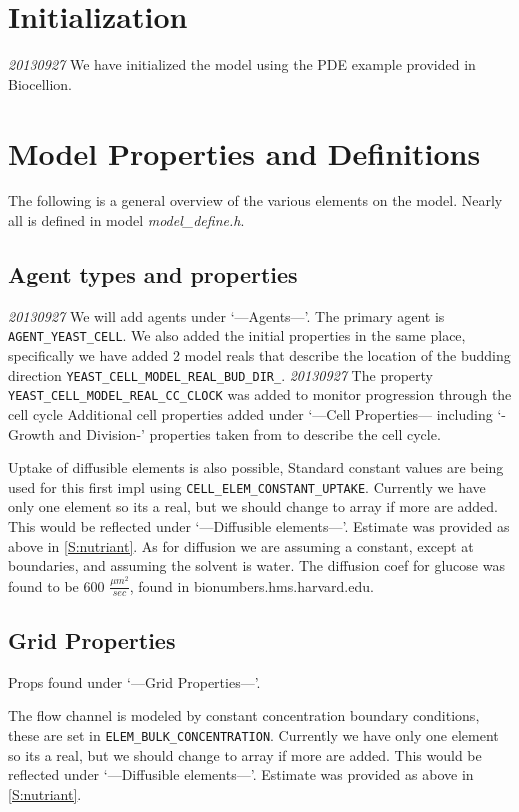\documentclass{article}
\begin{document}
\section{Initialization}
\emph{20130927} We have initialized the model using the PDE example provided in Biocellion.

\section{Model Properties and Definitions}
The following is a general overview of the various elements on the model.
Nearly all is defined in model \textit{model\_define.h}.

\subsection{Agent types and properties}
\emph{20130927} We will add agents under `---Agents---'.
The primary agent is \texttt{AGENT\_YEAST\_CELL}.
We also added the initial properties in the same place,
specifically we have added 2 model reals that describe the 
location of the budding direction \texttt{YEAST\_CELL\_MODEL\_REAL\_BUD\_DIR\_}.
\emph{20130927} The property \texttt{YEAST\_CELL\_MODEL\_REAL\_CC\_CLOCK}
was added to monitor progression through the cell cycle \cite{Charvin2009}
Additional cell properties added under `---Cell Properties--- including 
`-Growth and Division-' properties taken from \cite{Charvin2009} to describe the cell cycle.

Uptake of diffusible elements is also possible,
Standard constant values are being used for this first impl using \texttt{CELL\_ELEM\_CONSTANT\_UPTAKE}.
Currently we have only one element so its a real, 
but we should change to array if more are added.
This would be reflected under `---Diffusible elements---'.
Estimate was provided as above in \ref{S:nutriant}.
As for diffusion we are assuming a constant, except at boundaries,
and assuming the solvent is water.
The diffusion coef for glucose was found to be 600 $\frac{\mu m^2}{sec}$,
found in bionumbers.hms.harvard.edu.



\subsection{Grid Properties} 
Props found under `---Grid Properties---'.

The flow channel is modeled by constant concentration boundary conditions, 
these are set in \texttt{ELEM\_BULK\_CONCENTRATION}.
Currently we have only one element so its a real, 
but we should change to array if more are added.
This would be reflected under `---Diffusible elements---'.
Estimate was provided as above in \ref{S:nutriant}. 
\end{document}
